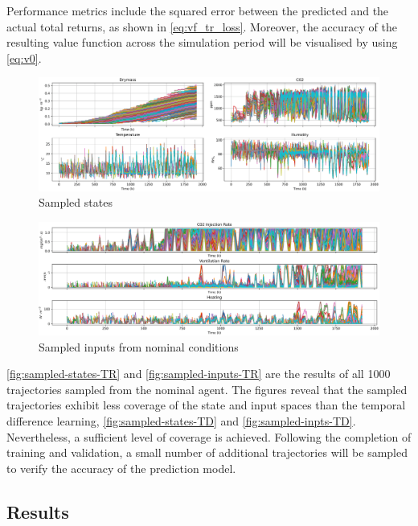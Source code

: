 Performance metrics include the squared error between the predicted and the actual total returns, as shown in  \autoref{eq:vf_tr_loss}. Moreover, the accuracy of the resulting value function across the simulation period will be visualised by using \autoref{eq:v0}.


\begin{figure}[H]
    \centering
    \includegraphics[width = \textwidth]{figures/sampled_states_TR-eps-converted-to.png}
    \caption{Sampled states}
    \label{fig:sampled-states-TR}
\end{figure}


\begin{figure}[H]
    \centering
    \includegraphics[width = \textwidth]{figures/sampled_inputs_TR-eps-converted-to.png}
    \caption{Sampled inputs from nominal conditions}
    \label{fig:sampled-inputs-TR}
\end{figure}

\autoref{fig:sampled-states-TR} and \autoref{fig:sampled-inputs-TR} are the results of all 1000 trajectories sampled from the nominal agent. The figures reveal that the sampled trajectories exhibit less coverage of the state and input spaces than the temporal difference learning,  \autoref{fig:sampled-states-TD} and \autoref{fig:sampled-inpts-TD}. Nevertheless, a sufficient level of coverage is achieved. Following the completion of training and validation, a small number of additional trajectories will be sampled to verify the accuracy of the prediction model.

\subsection{Results}

